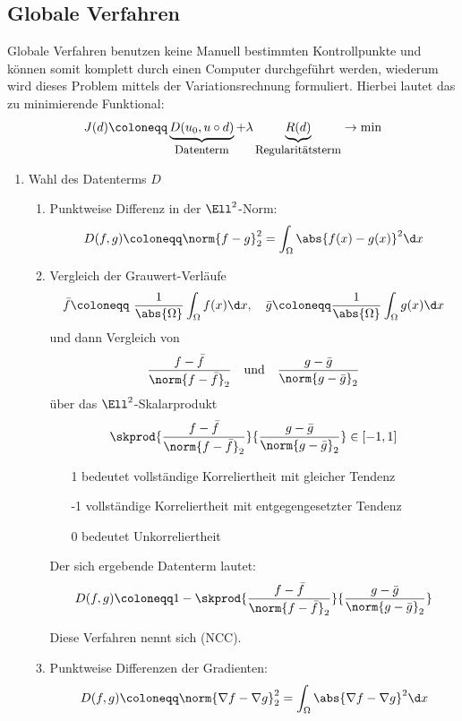 \subsection{Globale Verfahren}

Globale Verfahren benutzen keine Manuell bestimmten Kontrollpunkte und können somit komplett durch einen Computer durchgeführt werden, wiederum wird dieses Problem mittels der Variationsrechnung formuliert.
Hierbei lautet das zu minimierende Funktional:
\[J(d) \coloneqq \underbrace{\vphantom{R(d)}D(u_0,u \circ d)}_{\text{\small Datenterm}} + \lambda \underbrace{R(d)}_{\text{\small Regularitätsterm}} \to \min\]

\begin{enumerate}
    \item Wahl des Datenterms $D$
    \begin{enumerate}
        \item Punktweise Differenz in der $\Ell^2$-Norm:
            \[D(f,g)  \coloneqq  \norm{f-g}_2^2 = \int_\Omega \abs{f(x)-g(x)}^2 \d x\]
        \item Vergleich der Grauwert-Verläufe
            \[\bar{f}  \coloneqq \ \frac{1}{\abs{\Omega}} \int_\Omega f(x) \d x, \quad \bar{g}  \coloneqq  \frac{1}{\abs{\Omega}} \int_\Omega g(x) \d x\]
            und dann Vergleich von
            \[\frac{f - \bar{f}}{\norm{f-\bar{f}}_2} \quad \text{und} \quad \frac{g - \bar{g}}{\norm{g-\bar{g}}_2}\]
            über das $\Ell^2$-Skalarprodukt
            \[\skprod{\frac{f - \bar{f}}{\norm{f-\bar{f}}_2}}{\frac{g - \bar{g}}{\norm{g-\bar{g}}_2}} \in [-1,1]\]

            \begin{enumerate}
                \item[1] bedeutet vollständige Korreliertheit mit gleicher Tendenz
                \item[-1] vollständige Korreliertheit mit entgegengesetzter Tendenz
                \item[0] bedeutet Unkorreliertheit
            \end{enumerate}

            Der sich ergebende Datenterm lautet:
            \[D(f,g)  \coloneqq  1 - \skprod{\frac{f - \bar{f}}{\norm{f-\bar{f}}_2}}{\frac{g - \bar{g}}{\norm{g-\bar{g}}_2}}\]

            Diese Verfahren nennt sich  (NCC).
            \item Punktweise Differenzen der Gradienten:
                \[D(f,g)  \coloneqq  \norm{\nabla f - \nabla g}_2^2 = \int_\Omega \abs{\nabla f - \nabla g}^2 \d x\]


\end{enumerate}
\end{enumerate}
